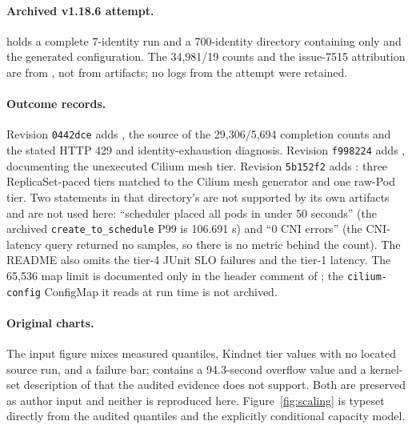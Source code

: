 \paragraph{Archived v1.18.6 attempt.}
 holds a complete
7-identity run and a 700-identity directory containing only
 and the generated configuration. The
34,981/19 counts and the issue-7515 attribution are from
, not from artifacts; no logs from the
attempt were retained.

\paragraph{Outcome records.}
Revision \texttt{0442dce} adds
,
the source of the 29,306/5,694 completion counts and the stated HTTP 429
and identity-exhaustion diagnosis. Revision \texttt{f998224} adds
, documenting the
unexecuted Cilium mesh tier. Revision \texttt{5b152f2} adds
: three ReplicaSet-paced \sys{}
tiers matched to the Cilium mesh generator and one raw-Pod tier. Two
statements in that directory's  are not supported by its
own artifacts and are not used here: ``scheduler placed all pods in
under 50 seconds'' (the archived \texttt{create\_to\_schedule} P99 is
106.691 s) and ``0 CNI errors'' (the CNI-latency query returned no
samples, so there is no metric behind the count). The README also omits
the tier-4 JUnit SLO failures and the tier-1 latency. The 65,536 map
limit is documented only in the header comment of
; the \texttt{cilium-config} ConfigMap
it reads at run time is not archived.

\paragraph{Original charts.}
The input figure 
mixes measured quantiles, Kindnet tier values with no located source
run, and a failure bar; 
contains a 94.3-second overflow value and a kernel-set description of
\sys{} that the audited evidence does not support. Both are preserved as
author input and neither is reproduced here. Figure~\ref{fig:scaling} is
typeset directly from the audited quantiles and the explicitly
conditional capacity model.

